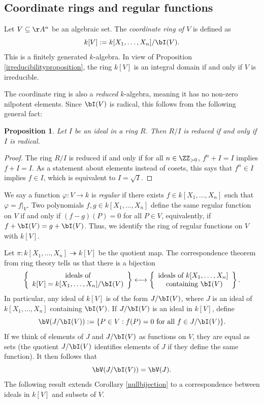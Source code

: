 \documentclass[12pt]{amsart}
\theoremstyle{plain}
\newtheorem{proposition}[theorem]{Proposition}
\begin{document}
\subsection{Coordinate rings and regular functions}
Let $V \subseteq \AA^n$ be an algebraic set.
The \emph{coordinate ring of $V$} is defined as
$$k[V] := k[X_1, \ldots, X_n] / \bI(V).$$
This is a finitely generated $k$-algebra.
In view of Proposition \ref{irreducibilityproposition}, the ring $k[V]$ is an integral domain if and only if $V$ is irreducible.

The coordinate ring is also a \emph{reduced} $k$-algebra, meaning it has no non-zero nilpotent elements.
Since $\bI(V)$ is radical, this follows from the following general fact:

\begin{proposition}\label{reducedradical}
Let $I$ be an ideal in a ring $R$.
Then $R/I$ is reduced if and only if $I$ is radical.
\end{proposition}
\begin{proof}
The ring $R/I$ is reduced if and only if for all $n \in \ZZ_{> 0}$, $f^n + I = I$ implies $f + I = I$.
As a statement about elements instead of cosets, this says that $f^n \in I$ implies $ f \in I$, which is equivalent to $I = \sqrt{I}$.
\end{proof}

We say a function $\varphi \colon V \to k$ is \emph{regular} if there exists $f \in k[X_1, \ldots, X_n]$ such that $\varphi = \left. f \right|_V$.
Two polynomials $f, g \in k[X_1, \ldots, X_n]$ define the same regular function on $V$ if and only if $(f- g)(P) = 0$ for all $P \in V$,
equivalently, if $f + \bI(V) = g + \bI(V)$.
Thus, we identify the ring of regular functions on $V$ with $k[V]$.

Let $\pi : k[X_1, \ldots, X_n] \twoheadrightarrow k[V]$ be the quotient map.
The correspondence theorem from ring theory tells us that there is a bijection
\begin{align}\label{ringidealbijection}
\left\{
\begin{array}{c}
	\text{ideals of} \\
	k[V]=k[X_1,\ldots,X_n]/\bI(V)
\end{array}
\right\} \longleftrightarrow 
\left\{
\begin{array}{c}
	\text{ideals of } k[X_1, \ldots, X_n] \\
	\text{ containing } \bI(V)
\end{array}
\right\}.
\end{align}
In particular, any ideal of $k[V]$ is of the form $J/\bI(V)$, where $J$ is an ideal of $k[X_1, \ldots, X_n]$ containing $\bI(V)$.
If $J / \bI(V)$ is an ideal in $k[V]$, define
$$\bV(J/\bI(V)) := \{P \in V : f(P) = 0 \text{ for all } f \in J/\bI(V)\}.$$
If we think of elements of $J$ and $J/\bI(V)$ as functions on $V$, they are equal as sets (the quotient $J/\bI(V)$ identifies elements of $J$ if they define the same function).
It then follows that
$$\bV(J/\bI(V)) = \bV(J).$$
The following result extends Corollary \ref{nullbijection} to a correspondence between ideals in $k[V]$ and subsets of $V$.
\end{document}
